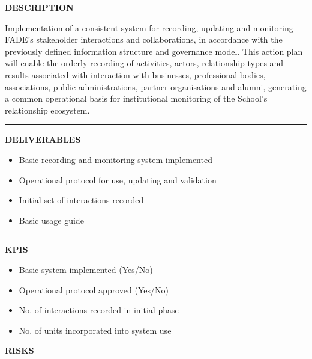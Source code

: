 \documentclass[11pt,a4paper]{scrreprt}
\newcommand{\fieldlabel}[1]{%
  {\footnotesize\sffamily\bfseries\color{mutedcolor}\MakeUppercase{#1}}\par\nopagebreak[4]
}
\newcommand{\fieldsep}{\vspace{3pt}\noindent\textcolor{bordercolor}{\rule{\linewidth}{0.4pt}}\vspace{3pt}\par}
\begin{document}
\begin{tcolorbox}[pabox={filcolor}{A.P.3.1 \enspace\textbullet\enspace Implementation of the Interaction and Collaboration Recording and Monitoring System}]

\fieldlabel{Description}
{\small Implementation of a consistent system for recording, updating and monitoring FADE's stakeholder interactions and collaborations, in accordance with the previously defined information structure and governance model. This action plan will enable the orderly recording of activities, actors, relationship types and results associated with interaction with businesses, professional bodies, associations, public administrations, partner organisations and alumni, generating a common operational basis for institutional monitoring of the School's relationship ecosystem. }\par
\fieldsep
\fieldlabel{Deliverables}
{\small \begin{itemize}[noitemsep,topsep=2pt]
\item Basic recording and monitoring system implemented
\item Operational protocol for use, updating and validation
\item Initial set of interactions recorded
\item Basic usage guide
\end{itemize}}\par
\fieldsep
\fieldlabel{KPIs}
{\small \begin{itemize}[noitemsep,topsep=2pt]
\item Basic system implemented (Yes/No)
\item Operational protocol approved (Yes/No)
\item No. of interactions recorded in initial phase
\item No. of units incorporated into system use
\end{itemize}}\par
\end{tcolorbox}
\begin{tcolorbox}[riskbox]
{\footnotesize\sffamily\bfseries\color{red!50!black} RISKS}\par{}
\end{tcolorbox}
\end{document}
